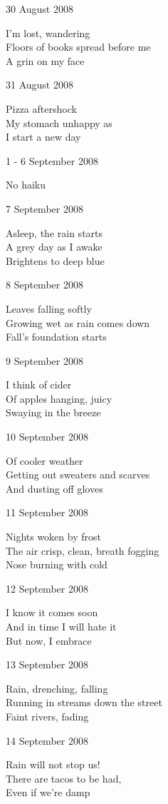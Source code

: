 \documentclass[12pt]{article}
\begin{document}
30 August 2008

I'm lost, wandering \\
Floors of books spread before me \\
A grin on my face


\newpage

31 August 2008

Pizza aftershock \\
My stomach unhappy as \\
I start a new day

1 - 6 September 2008

No haiku

7 September 2008

Asleep, the rain starts \\
A grey day as I awake \\
Brightens to deep blue

8 September 2008

Leaves falling softly \\
Growing wet as rain comes down \\
Fall's foundation starts

9 September 2008

I think of cider \\
Of apples hanging, juicy \\
Swaying in the breeze

10 September 2008

Of cooler weather \\
Getting out sweaters and scarves \\
And dusting off gloves

11 September 2008

Nights woken by frost \\
The air crisp, clean, breath fogging \\
Nose burning with cold

\newpage

12 September 2008

I know it comes soon \\
And in time I will hate it \\
But now, I embrace

13 September 2008

Rain, drenching, falling \\
Running in streams down the street \\
Faint rivers, fading

14 September 2008

Rain will not stop us! \\
There are tacos to be had, \\
Even if we're damp
\end{document}
